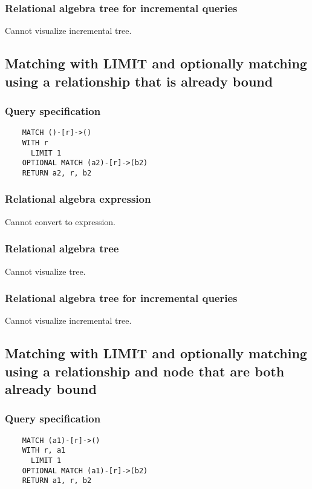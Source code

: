 	\subsubsection*{Relational algebra tree for incremental queries}

	Cannot visualize incremental tree.
	\subsection{Matching with LIMIT and optionally matching using a relationship that is already bound}

	\subsubsection*{Query specification}

	\begin{lstlisting}
	MATCH ()-[r]->()
	WITH r
	  LIMIT 1
	OPTIONAL MATCH (a2)-[r]->(b2)
	RETURN a2, r, b2
	\end{lstlisting}


	\subsubsection*{Relational algebra expression}

	Cannot convert to expression.

	\subsubsection*{Relational algebra tree}

	Cannot visualize tree.

	\subsubsection*{Relational algebra tree for incremental queries}

	Cannot visualize incremental tree.
	\subsection{Matching with LIMIT and optionally matching using a relationship and node that are both already bound}

	\subsubsection*{Query specification}

	\begin{lstlisting}
	MATCH (a1)-[r]->()
	WITH r, a1
	  LIMIT 1
	OPTIONAL MATCH (a1)-[r]->(b2)
	RETURN a1, r, b2
	\end{lstlisting}


